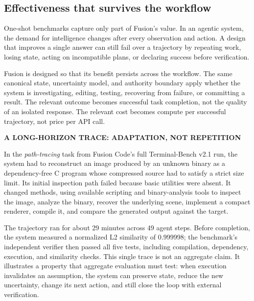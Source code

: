 \subsection{Effectiveness that survives the workflow}

One-shot benchmarks capture only part of Fusion's value. In an agentic system,
the demand for intelligence changes after every observation and action. A
design that improves a single answer can still fail over a trajectory by
repeating work, losing state, acting on incompatible plans, or declaring
success before verification.

Fusion is designed so that its benefit persists across the workflow. The same
canonical state, uncertainty model, and authority boundary apply whether the
system is investigating, editing, testing, recovering from failure, or
committing a result. The relevant outcome becomes successful task completion,
not the quality of an isolated response. The relevant cost becomes compute per
successful trajectory, not price per API call.

\begin{tcolorbox}[
  enhanced,
  breakable,
  colback=fusionpaper,
  colframe=fusionpaper,
  boxrule=0pt,
  arc=2pt,
  left=11pt,right=11pt,top=9pt,bottom=9pt
]
{\sffamily\bfseries\color{fusionink}A LONG-HORIZON TRACE: ADAPTATION,
NOT REPETITION}\par\smallskip
In the \emph{path-tracing} task from Fusion Code's full Terminal-Bench v2.1
run, the system had to reconstruct an image produced by an unknown binary as a
dependency-free C program whose compressed source had to satisfy a strict size
limit. Its initial inspection path failed because basic utilities were absent.
It changed methods, using available scripting and binary-analysis tools to
inspect the image, analyze the binary, recover the underlying scene, implement
a compact renderer, compile it, and compare the generated output against the
target.

The trajectory ran for about 29 minutes across 49 agent steps. Before
completion,
the system measured a normalized L2 similarity of 0.999998; the benchmark's
independent verifier then passed all five tests, including compilation,
dependency, execution, and similarity checks. This single trace is not an
aggregate claim. It illustrates a property that aggregate evaluation must test:
when execution invalidates an assumption, the system can preserve state,
reduce the new uncertainty, change its next action, and still close the loop
with external verification.
\end{tcolorbox}

